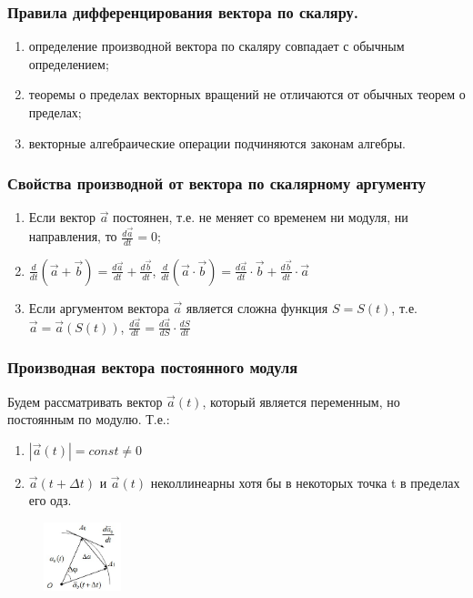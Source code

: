 \documentclass{article}
\begin{document}
  \subsubsection{Правила дифференцирования вектора по скаляру.}
  \begin{enumerate}
    \item определение производной вектора по скаляру совпадает с обычным определением;
    \item теоремы о пределах векторных вращений не отличаются от обычных теорем о пределах;
    \item векторные алгебраические операции подчиняются законам алгебры.
  \end{enumerate}

  \subsubsection{Свойства производной от вектора по скалярному аргументу}
  \begin{enumerate}
    \item Если вектор $\vec{a}$ постоянен, т.е. не меняет со временем ни модуля, ни направления, то $\frac{d\vec{a}}{dt} = 0$;
    \item $\frac {d}{dt} (\vec{a}+\vec{b}) = \frac{d\vec{a}}{dt} +\frac{d\vec{b}}{dt}$, $\frac {d}{dt} (\vec{a}\cdot\vec{b}) = \frac{d\vec{a}}{dt}\cdot\vec{b} + \frac{d\vec{b}}{dt}\cdot\vec{a}$
    \item Если аргументом вектора $\vec{a}$ является сложна функция $S = S(t)$, т.е.
    $\vec{a} = \vec{a}(S(t))$, $\frac{d\vec{a}}{dt} = \frac{d\vec{a}}{dS}\cdot\frac{dS}{dt}$
  \end{enumerate}

  \subsubsection{Производная вектора постоянного модуля}
  Будем рассматривать вектор $\vec{a}(t)$, который является переменным, но постоянным по модулю. Т.е.:
  \begin{enumerate}
    \item $|\vec{a}(t)| = const \neq 0$
    \item $\vec{a}(t+\Delta t)$ и $\vec{a}(t)$ неколлинеарны хотя бы в некоторых точка t в пределах его одз.
  \end{enumerate}
  \begin{figure}[H]
      \centering
    \includegraphics[width=0.2\textwidth]{image2_6.png}
  \end{figure}
\end{document}
